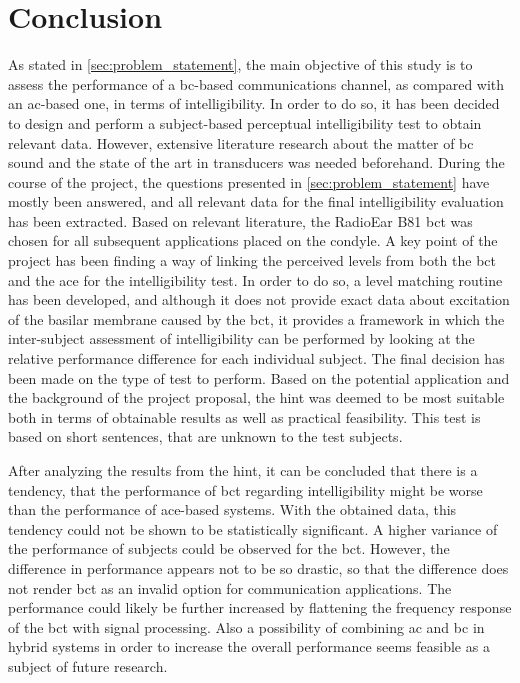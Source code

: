 \section{Conclusion}\label{sec:conclusion}
As stated in \autoref{sec:problem_statement}, the main objective of this study is to assess the performance of a \gls{bc}-based communications channel, as compared with an \gls{ac}-based one, in terms of intelligibility.
In order to do so, it has been decided to design and perform a subject-based perceptual intelligibility test to obtain relevant data. However, extensive literature research about the matter of \gls{bc} sound and the state of the art in transducers was needed beforehand.
During the course of the project, the questions presented in \autoref{sec:problem_statement} have mostly been answered, and all relevant data for the final intelligibility evaluation has been extracted.
Based on relevant literature, the RadioEar B81 \gls{bct} was chosen for all subsequent applications placed on the condyle.
A key point of the project has been finding a way of linking the perceived levels from both the \gls{bct} and the \gls{ace} for the intelligibility test. 
In order to do so, a level matching routine has been developed, and although it does not provide exact data about excitation of the basilar membrane caused by the \gls{bct}, it provides a framework in which the inter-subject assessment of intelligibility can be performed by looking at the relative performance difference for each individual subject. 
The final decision has been made on the type of test to perform. Based on the potential application and the background of the project proposal, the \gls{hint} was deemed to be most suitable both in terms of obtainable results as well as practical feasibility. This test is based on short sentences, that are unknown to the test subjects.

After analyzing the results from the \gls{hint}, it can be concluded that there is a tendency, that the performance of \gls{bct} regarding intelligibility might be worse than the performance of \gls{ace}-based systems. 
With the obtained data, this tendency could not be shown to be statistically significant. A higher variance of the performance of subjects could be observed for the \gls{bct}.
However, the difference in performance appears not to be so drastic, so that the difference does not render \gls{bct} as an invalid option for communication applications. The performance could likely be further increased by flattening the frequency response of the \gls{bct} with signal processing. Also a possibility of combining \gls{ac} and \gls{bc} in hybrid systems in order to increase the overall performance seems feasible as a subject of future research.





